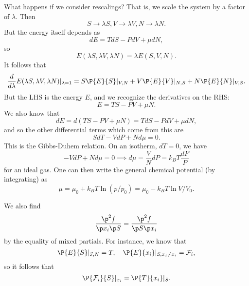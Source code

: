 What happens if we consider rescalings? That is, we scale the system by a factor of $\lambda$. Then
\begin{equation}
    S\to \lambda S, V \to \lambda V, N \to \lambda N.
\end{equation}
But the energy itself depends as
\begin{equation}
    dE = TdS - PdV + \mu dN,
\end{equation}
so
\begin{equation}
    E(\lambda S, \lambda V,\lambda N) = \lambda E(S,V,N).
\end{equation}
It follows that
\begin{equation}
    \frac{d}{d\lambda} E(\lambda S, \lambda V, \lambda N)|_{\lambda =1} = S \P{E}{S}|_{V,N} + V\P{E}{V}|_{N,S} +N \P{E}{N}|_{V,S}.
\end{equation}
But the LHS is the energy $E$, and we recognize the derivatives on the RHS:
\begin{equation}
    E = TS - PV + \mu N.
\end{equation}
We also know that
\begin{equation}
    dE = d(TS-PV+\mu N) = TdS - PdV +\mu dN,
\end{equation}
and so the other differential terms which come from this are
\begin{equation}
    \boxed{S dT - V dP + N d\mu =0.}
\end{equation}
This is the Gibbs-Duhem relation.
On an isotherm, $dT=0$, we have
\begin{equation}
    -VdP + Nd\mu =0 \implies d\mu = \frac{V}{N} dP = k_B T \frac{dP}{P}
\end{equation}
for an ideal gas. One can then write the general chemical potential (by integrating) as
\begin{equation}
    \mu = \mu_0 + k_B T \ln (p/p_0) = \mu_0 - k_B T \ln V/V_0.
\end{equation}

We also find 
\begin{equation}
    \frac{\p^2 f}{\p x_i \p S} = \frac{\p^2 f}{\p S \p x_i}
\end{equation}
by the equality of mixed partials.
For instance, we know that
\begin{equation}
    \P{E}{S}|_{\vec x,N} = T, \quad \P{E}{x_i}|_{S,x_j \neq x_i} = \mathcal{F}_i,
\end{equation}
so it follows that
\begin{equation}
    \P{\mathcal{F}_i}{S}|_{x_i} = \P{T}{x_i}|_S.
\end{equation}